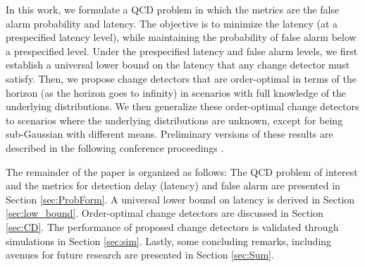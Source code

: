 \documentclass[12pt]{interact}
\theoremstyle{plain}
\newcommand{\yhh}[1]{{\color{purple}{#1}}}
\begin{document}

In this work, we formulate a QCD problem in which the metrics are the false alarm probability and latency. 
The objective is to minimize the latency (at a prespecified latency level), while maintaining the probability of false alarm below a prespecified level. Under the prespecified latency and false alarm levels, we first establish a universal lower bound on the latency that any change detector must satisfy. Then, we propose change detectors that are order-optimal in terms of the horizon (as the horizon goes to infinity) in scenarios with full knowledge of the underlying distributions. We then generalize these order-optimal change detectors to scenarios where the underlying distributions are unknown, except for being sub-Gaussian with different means.  Preliminary versions of these results are described in the following conference proceedings \citep{huang2024high, huang2025sequentialchangedetectionlearning}.

The remainder of the paper is organized as follows: The QCD problem of interest and the metrics for detection delay (latency) and false alarm are presented in Section \ref{sec:ProbForm}. A universal lower bound on latency is derived in Section \ref{sec:low_bound}. Order-optimal change detectors are discussed in Section \ref{sec:CD}. The performance of proposed change detectors is validated through simulations in Section \ref{sec:sim}. Lastly, some concluding remarks, including avenues for future research  are presented in Section \ref{sec:Sum}.
\end{document}
